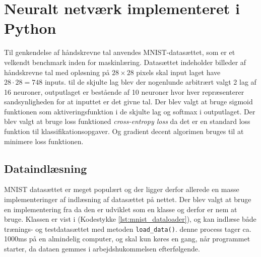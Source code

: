 \documentclass{article}
\newcommand{\listingref}[1]{(Kodestykke \ref{#1})}
\begin{document}
\section{Neuralt netværk implementeret i Python}
Til genkendelse af håndskrevne tal anvendes MNIST-datasættet, som er et velkendt benchmark inden for maskinlæring. Datasættet indeholder billeder af håndskrevne tal med opløsning på $28\times28$ pixels skal input laget have $28\cdot28=748$ inputs. til de skjulte lag blev der nogenlunde arbitrært valgt 2 lag af 16 neuroner, outputlaget er bestående af 10 neuroner hvor hver repræsenterer sandsynligheden for at inputtet er det givne tal. Der blev valgt at bruge sigmoid funktionen som aktiveringsfunktion i de skjulte lag og softmax i outputlaget. Der blev valgt at bruge loss funktioned \textit{cross-entropy loss} da det er en standard loss funktion til klassifikationsopgaver. Og gradient decent algorimen bruges til at minimere loss funktionen.
\subsection{Dataindlæsning}
MNIST datasættet er meget populært og der ligger derfor allerede en masse implementeringer af indlæsning af datasættet på nettet. Der blev valgt at bruge en implementering fra \parencite{Khodabakhsh} da den er udviklet som en klasse og derfor er nem at bruge. Klassen er vist i \listingref{lst:mnist_dataloader}, og kan indlæse både trænings- og testdatasættet med metoden \texttt{load\_data()}. denne process tager ca. 1000ms på en almindelig computer, og skal kun køres en gang, når programmet starter, da dataen gemmes i arbejdshukommelsen efterfølgende. 
\end{document}
